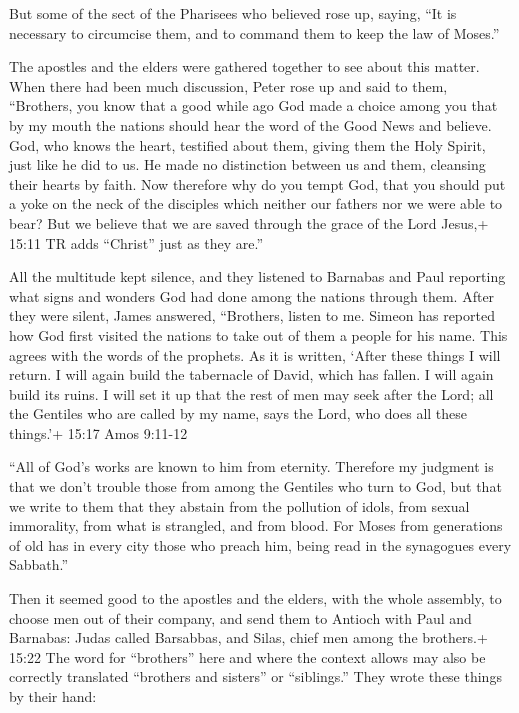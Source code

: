  But some of the sect of the Pharisees who believed rose up,
saying, ``It is necessary to circumcise them, and to command them to
keep the law of Moses.''

 The apostles and the elders were gathered together to see
about this matter.  When there had been much discussion,
Peter rose up and said to them, ``Brothers, you know that a good while
ago God made a choice among you that by my mouth the nations should hear
the word of the Good News and believe.  God, who knows the
heart, testified about them, giving them the Holy Spirit, just like he
did to us.  He made no distinction between us and them,
cleansing their hearts by faith.  Now therefore why do you
tempt God, that you should put a yoke on the neck of the disciples which
neither our fathers nor we were able to bear?  But we
believe that we are saved through the grace of the Lord Jesus,+ 15:11 TR
adds ``Christ'' just as they are.''

 All the multitude kept silence, and they listened to
Barnabas and Paul reporting what signs and wonders God had done among
the nations through them.  After they were silent, James
answered, ``Brothers, listen to me.  Simeon has reported
how God first visited the nations to take out of them a people for his
name.  This agrees with the words of the prophets. As it is
written,  `After these things I will return. I will again
build the tabernacle of David, which has fallen. I will again build its
ruins. I will set it up  that the rest of men may seek
after the Lord; all the Gentiles who are called by my name, says the
Lord, who does all these things.'+ 15:17 Amos 9:11-12

 ``All of God's works are known to him from eternity.
 Therefore my judgment is that we don't trouble those from
among the Gentiles who turn to God,  but that we write to
them that they abstain from the pollution of idols, from sexual
immorality, from what is strangled, and from blood.  For
Moses from generations of old has in every city those who preach him,
being read in the synagogues every Sabbath.''

 Then it seemed good to the apostles and the elders, with
the whole assembly, to choose men out of their company, and send them to
Antioch with Paul and Barnabas: Judas called Barsabbas, and Silas, chief
men among the brothers.+ 15:22 The word for ``brothers'' here and where
the context allows may also be correctly translated ``brothers and
sisters'' or ``siblings.''  They wrote these things by
their hand:

